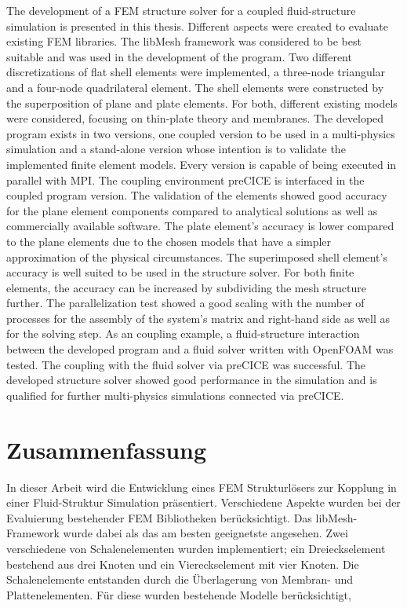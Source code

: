 The development of a FEM structure solver for a coupled fluid-structure simulation is presented in this thesis. Different aspects were created to evaluate existing FEM libraries. The libMesh framework was considered to be best suitable and was used in the development of the program. Two different discretizations %
of flat shell elements were implemented, a three-node triangular and a four-node quadrilateral element. The shell elements were constructed by the superposition of plane and plate elements. For both, different existing models were considered, focusing on thin-plate theory and membranes. The developed program exists in two versions, one coupled version to be used in a multi-physics simulation and a stand-alone version whose intention is to validate the implemented finite element models. Every version is capable of being executed in parallel with MPI. The coupling environment preCICE is interfaced in the coupled program version. The validation of the elements showed good accuracy for the plane element components compared to analytical solutions as well as commercially available software. The plate element's accuracy is lower compared to the plane elements due to the chosen models that have a simpler approximation of the physical circumstances. The superimposed shell element's accuracy is well suited to be used in the structure solver. For both finite elements, the accuracy can be increased by subdividing the mesh structure further. The parallelization test showed a good scaling with the number of processes for the assembly of the system's matrix and right-hand side as well as for the solving step. As an coupling example, a fluid-structure interaction between the developed program and a fluid solver written with OpenFOAM was tested. The coupling with the fluid solver via preCICE was successful. The developed structure solver showed good performance in the simulation and is qualified for further multi-physics simulations connected via preCICE.

\cleardoublepage
\section*{Zusammenfassung}
In dieser Arbeit wird die Entwicklung eines FEM Strukturlösers zur Kopplung in einer Fluid-Struktur Simulation präsentiert. Verschiedene Aspekte wurden bei der Evaluierung bestehender FEM Bibliotheken berücksichtigt. Das libMesh-Framework wurde dabei als das am besten geeignetste angesehen. Zwei verschiedene %
von Schalenelementen wurden implementiert; ein Dreieckselement bestehend aus drei Knoten und ein Viereckselement mit vier Knoten. Die Schalenelemente entstanden durch die Überlagerung von Membran- und Plattenelementen. Für diese wurden bestehende Modelle berücksichtigt, 
